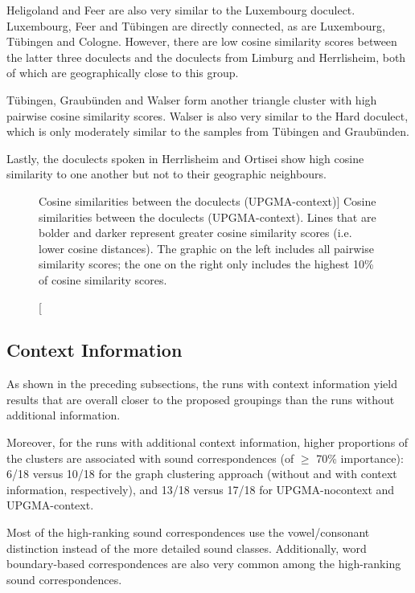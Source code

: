 \documentclass[a4paper]{article}
\begin{document}
Heligoland and Feer are also very similar to the Luxembourg doculect.
Luxembourg, Feer and T\"{u}bingen are directly connected,
as are Luxembourg, T\"{u}bingen and Cologne.
However, there are low cosine similarity scores between
the latter three doculects and
the doculects from Limburg and Herrlisheim,
both of which are geographically close to this group.

T\"{u}bingen, Graub\"{u}nden and Walser form another
triangle cluster with high pairwise cosine similarity scores.
Walser is also very similar to the Hard doculect,
which is only moderately similar to the samples
from T\"{u}bingen and Graub\"{u}nden.

Lastly, the doculects spoken in Herrlisheim and Ortisei
show high cosine similarity to one another but not to their
geographic neighbours.

\begin{figure}[h]
\begin{adjustwidth}{-3cm}{-3cm}
\centering

\hspace{-7em}

\end{adjustwidth}
\caption
[Cosine similarities between the doculects (UPGMA-context)]
{
Cosine similarities between the doculects (UPGMA-context).
Lines that are bolder and darker represent greater cosine similarity scores
(i.e. lower cosine distances).
The graphic on the left includes all pairwise similarity scores;
the one on the right only includes the highest 10\% of cosine similarity scores.
}
\label{fig:cosine}
\end{figure}


\subsection{Context Information}

As shown in the preceding subsections,
the runs with context information yield results
that are overall closer to the proposed groupings
than the runs without additional information.

Moreover, for the runs with additional context information,
higher proportions of the clusters are associated with
sound correspondences (of $\geq$ 70\% importance):
6/18 versus 10/18 for the graph clustering approach
(without and with context information, respectively),
and 13/18 versus 17/18 for UPGMA-nocontext and UPGMA-context.

Most of the high-ranking sound correspondences
use the vowel/consonant distinction instead of
the more detailed sound classes.
Additionally, word boundary-based correspondences are also very common
among the high-ranking sound correspondences.
\end{document}
